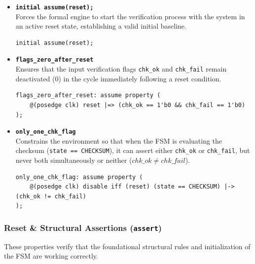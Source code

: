 \documentclass{article}
\begin{document}
\begin{itemize}
    \item \textbf{\texttt{initial assume(reset);}} \\
    Forces the formal engine to start the verification process with the system in an active reset state, establishing a valid initial baseline.
    \begin{verbatim}
initial assume(reset);
    \end{verbatim}
    
    \item \textbf{\texttt{flags\_zero\_after\_reset}} \\
    Ensures that the input verification flags \texttt{chk\_ok} and \texttt{chk\_fail} remain deactivated ($0$) in the cycle immediately following a reset condition.
    \begin{verbatim}
flags_zero_after_reset: assume property (
    @(posedge clk) reset |=> (chk_ok == 1'b0 && chk_fail == 1'b0)
);
    \end{verbatim}
    
    \item \textbf{\texttt{only\_one\_chk\_flag}} \\
    Constrains the environment so that when the FSM is evaluating the checksum (\texttt{state == CHECKSUM}), it can assert either \texttt{chk\_ok} or \texttt{chk\_fail}, but never both simultaneously or neither ($chk\_ok \neq chk\_fail$).
    \begin{verbatim}
only_one_chk_flag: assume property (
    @(posedge clk) disable iff (reset) (state == CHECKSUM) |-> (chk_ok != chk_fail)
);
    \end{verbatim}
\end{itemize}

\subsubsection{Reset \& Structural Assertions (\texttt{assert})}
These properties verify that the foundational structural rules and initialization of the FSM are working correctly.
\end{document}
